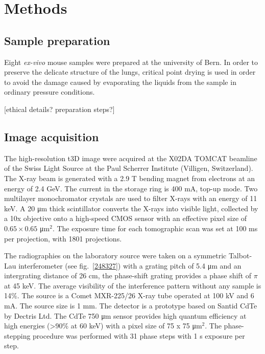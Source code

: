 \section{Methods}\label{sec:methods}
\subsection{Sample preparation}
Eight \emph{ex-vivo} mouse samples were prepared at the university of Bern.
In order to preserve the delicate structure of the lungs, critical point
drying is used in order to avoid the damage caused by evaporating the liquids
from the sample in ordinary pressure conditions.

[ethical details? preparation steps?]

\subsection{Image acquisition}\label{sec:acquisition}
The high-resolution t3D image were acquired at the X02DA
TOMCAT beamline of the Swiss Light Source at the Paul Scherrer Institute
(Villigen, Switzerland). The X-ray beam is generated with a 2.9 T bending
magnet from electrons at an energy of 2.4 GeV. The current in the storage
ring is 400 mA, top-up mode. Two multilayer monochromator crystals are used
to filter X-rays with an energy of 11 keV. A 20 μm thick scintillator
converts the X-rays into visible light, collected by a 10x objective onto a
high-speed CMOS sensor with an effective pixel size of $0.65 \times 0.65$
μm$^2$. The exposure time for each tomographic scan was set at 100 ms per
projection, with 1801 projections.

The radiographies on the laboratory source were taken on a symmetric
Talbot-Lau interferometer (see fig.~\ref{248327}) with a grating pitch of 5.4 μm and an intergrating
distance of 26 cm, the phase-shift grating provides a phase shift of $\pi$
at 45 keV. The average visibility of the interference pattern without any
sample is 14\%. The source is a Comet MXR-225/26 X-ray tube operated at 100
kV and 6 mA. The source size is 1 mm. The detector is a prototype based on
Santid CdTe by Dectris Ltd. The CdTe 750 μm sensor provides high quantum
efficiency at high energies (>90\% at 60 keV) with a pixel size of 75 x 75
μm$^2$. The phase-stepping procedure was performed with 31 phase steps with
1 s exposure per step.
